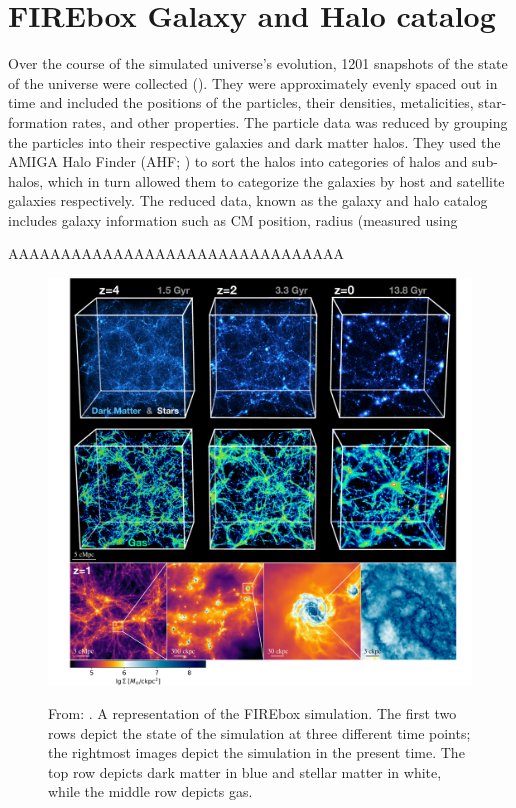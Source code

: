 
\section{FIREbox Galaxy and Halo catalog}
Over the course of the simulated universe's evolution, 1201 snapshots of the state of the universe were collected (\cite{feldmannFIREboxSimulatingGalaxies2022}). They were approximately evenly spaced out in time and included the positions of the particles, their densities, metalicities, star-formation rates, and other properties. The particle data was reduced by grouping the particles into their respective galaxies and dark matter halos. They used the AMIGA Halo Finder (AHF; \cite{knollmannAhfAMIGAHALO2009}) to sort the halos into categories of halos and sub-halos, which in turn allowed them to categorize the galaxies by host and satellite galaxies respectively. The reduced data, known as the galaxy and halo catalog includes galaxy information such as CM position, radius (measured using 

AAAAAAAAAAAAAAAAAAAAAAAAAAAAAAAA

\begin{figure}
    \includegraphics*[width=\textwidth]{figs/feldmann/fig1.pdf}
    \label{fig:feldmann-visual}
    \caption{
        From: \cite{feldmannFIREboxSimulatingGalaxies2022}. A representation of the FIREbox simulation. The first two rows depict the state of the simulation at three different time points; the rightmost images depict the simulation in the present time. The top row depicts dark matter in blue and stellar matter in white, while the middle row depicts gas. 
    }
\end{figure}

